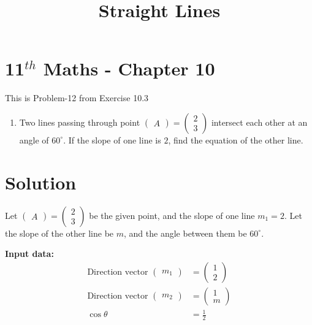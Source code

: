 \documentclass[10pt]{article}
\newcommand{\myvec}[1]{\ensuremath{\begin{pmatrix}#1\end{pmatrix}}}
\begin{document}
\title{\textbf{Straight Lines}}
\date{\vspace{-5ex}}
\maketitle

\section*{11$^{th}$ Maths - Chapter 10}
This is Problem-12 from Exercise 10.3

\begin{enumerate}
\item Two lines passing through point $\myvec{A} = \begin{pmatrix} 2 \\ 3 \end{pmatrix}$ intersect each other at an angle of $60^\circ$. If the slope of one line is $2$, find the equation of the other line.
\end{enumerate}

\section{Solution}

Let $\myvec{A} = \begin{pmatrix} 2 \\ 3 \end{pmatrix}$ be the given point, and the slope of one line $m_1 = 2$. Let the slope of the other line be $m$, and the angle between them be $60^\circ$.

\textbf{Input data:}
\begin{align}
\text{Direction vector } \myvec{m_1} &= \begin{pmatrix} 1 \\ 2 \end{pmatrix} \\
\text{Direction vector } \myvec{m_2} &= \begin{pmatrix} 1 \\ m \end{pmatrix} \\
\cos \theta &= \frac{1}{2}
\end{align}
\end{document}
